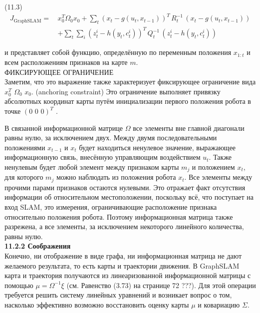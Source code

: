 \documentclass[10pt,a4paper]{article}
\begin{document}
(11.3)
\begin{equation*}
\begin{split}
J_{\text{GraphSLAM}}=\,&x_0^T\varOmega_0x_0+\sum_t(x_t-g(u_t,x_{t-1}))^T\,R_t^{-1}\,(x_t-g(u_t,x_{t-1}))\\
&+\sum_t\sum_i(z_t^i-h(y_t,c_t^i))^T\,Q_t^{-1}\,(z_t^i-h(y_t,c_t^i))
\end{split}
\end{equation*}

и представляет собой функцию, определённую по переменным положения $x_{1:t}$ и всем расположениям признаков на карте $m$.\\

ФИКСИРУЮЩЕЕ ОГРАНИЧЕНИЕ\\

Заметим, что это выражение также характеризует фиксирующее ограничение вида $x^T_0\,\,\varOmega_0\,\,x_0$. (anchoring  constraint) Это ограничение выполняет привязку абсолютных координат карты путём инициализации первого положения робота в точке $(0\,\,0\,\,0)^T$ .

В связанной информационной матрице $\varOmega$ все элементы вне главной диагонали равны нулю, за исключением двух. Между двумя последовательными положениями $x_{t-1}$ и $x_t$ будет находиться ненулевое значение, выражающее информационную связь, внесённую управляющим воздействием $u_t$. Также ненулевым будет любой элемент между признаком карты $m_j$ и положением $x_t$, для которого $m_j$ можно наблюдать из положения робота $x_t$. Все элементы между прочими парами признаков остаются нулевыми. Это отражает факт отсутствия информации об относительном местоположении, поскольку всё, что поступает на вход SLAM, это измерения, ограничивающие расположение признака относительно положения робота. Поэтому информационная матрица также разрежена, а все элементы, за исключением некоторого линейного количества, равны нулю.\\

\textbf{11.2.2	Соображения}\\

Конечно, ни отображение в виде графа, ни информационная матрица не дают желаемого результата, то есть карты и траектории движения. В GraphSLAM карта и траектория получаются из линеаризованной информационной матрицы с помощью $\mu=\varOmega^{-1}\xi$ (см. Равенство (3.73) на странице 72 ???). Для этой операции требуется решить систему линейных уравнений и возникает вопрос о том, насколько эффективно возможно восстановить оценку карты $\mu$ и ковариацию $\varSigma$.
\end{document}
